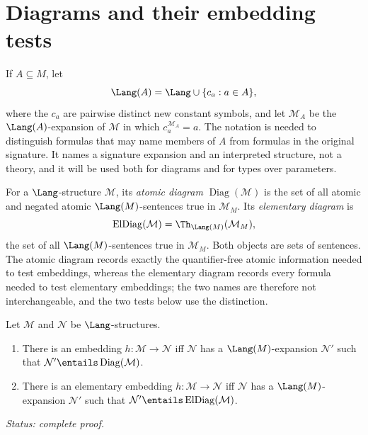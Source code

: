 \section{Diagrams and their embedding tests}
\label{sec:maps-elementarity-04}
\label{sec:diagrams}

\begin{definition}
\label{def:parameter-expansion}
If \(A\subseteq M\), let
\[
  \Lang(A)=\Lang\cup\{c_a:a\in A\},
\]
where the \(c_a\) are pairwise distinct new constant symbols, and let
\(\mathcal M_A\) be the \(\Lang(A)\)-expansion of \(\mathcal M\) in which
\(c_a^{\mathcal M_A}=a\).  The notation is needed to distinguish formulas
that may name members of \(A\) from formulas in the original signature.  It
names a signature expansion and an interpreted structure, not a theory, and it
will be used both for diagrams and for types over parameters.
\end{definition}

\begin{definition}
\label{def:diagrams}
For a \(\Lang\)-structure \(\mathcal M\), its \emph{atomic diagram}
\(\operatorname{Diag}(\mathcal M)\) is the set of all atomic and negated
atomic \(\Lang(M)\)-sentences true in \(\mathcal M_M\).  Its
\emph{elementary diagram} is
\[
  \operatorname{ElDiag}(\mathcal M)
  =\Th_{\Lang(M)}(\mathcal M_M),
\]
the set of all \(\Lang(M)\)-sentences true in \(\mathcal M_M\).  Both
objects are sets of sentences.  The atomic diagram records exactly the
quantifier-free atomic information needed to test embeddings, whereas the
elementary diagram records every formula needed to test elementary
embeddings; the two names are therefore not interchangeable, and the two
tests below use the distinction.
\end{definition}

\begin{theorem}
\label{thm:diagram-tests}
Let \(\mathcal M\) and \(\mathcal N\) be \(\Lang\)-structures.
\begin{enumerate}
  \item There is an embedding \(h:\mathcal M\to\mathcal N\) iff
        \(\mathcal N\) has a \(\Lang(M)\)-expansion \(\mathcal N'\) such
        that \(\mathcal N'\entails\operatorname{Diag}(\mathcal M)\).
  \item There is an elementary embedding
        \(h:\mathcal M\to\mathcal N\) iff
        \(\mathcal N\) has a \(\Lang(M)\)-expansion \(\mathcal N'\) such
        that \(\mathcal N'\entails\operatorname{ElDiag}(\mathcal M)\).
\end{enumerate}
\textit{Status: complete proof.}
\end{theorem}

